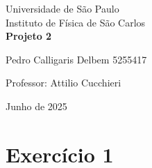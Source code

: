\documentclass[12pt, a4paper]{article} %
\begin{document}
	
	\begin{titlepage}
		\begin{center}
\Huge{Universidade de S\~ao Paulo}\\
\large{Instituto de Física de S\~ao Carlos}\\
\vspace{20pt}
\vspace{200pt}
\textbf{Projeto 2}\\
\vspace{8cm}
		\end{center}

\begin{flushleft}
\begin{tabbing}
Pedro Calligaris Delbem 5255417\\
\end{tabbing}
\vspace{0.5cm}
Professor: Attilio Cucchieri\\		
		\end{flushleft}
	
		\begin{center}
			\vspace{\fill}
	Junho de 2025	
		\end{center}
	\end{titlepage}

	\tableofcontents 
	\thispagestyle{empty}
	\newpage

    \section{Exerc\'icio 1}
\end{document}
